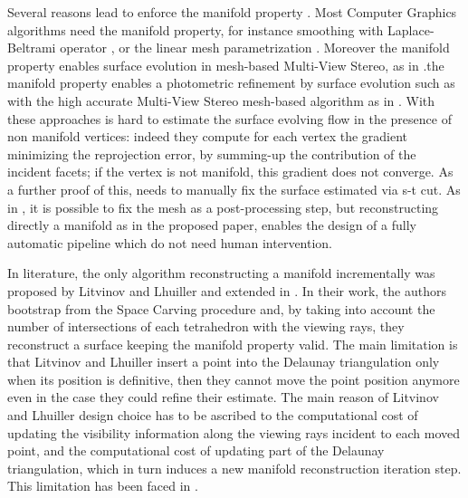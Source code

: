 Several reasons lead to enforce the manifold property \cite{lhuillier20152}. 
Most Computer Graphics algorithms need the manifold property, for instance smoothing with Laplace-Beltrami operator \cite{Meyer03}, or the linear mesh parametrization \cite{saboret00}.
Moreover the manifold property enables surface evolution in mesh-based Multi-View Stereo, as in \cite{vu_et_al_2012,delaunoy_et_al_08}.the manifold property enables a photometric refinement by surface evolution such as with the high accurate Multi-View Stereo mesh-based algorithm as in \cite{vu_et_al_2012,delaunoy_et_al_08}.
With these approaches is hard to estimate the surface evolving flow in the presence of non manifold vertices: indeed they compute for each vertex the gradient minimizing the reprojection error, by summing-up the contribution of the incident facets; if the vertex is not manifold, this gradient does not converge. As a further proof of this, \cite{vu_et_al_2012} needs to manually fix the surface estimated via s-t cut.
As in \cite{vu_et_al_2012}, it is possible to fix the mesh as a post-processing step, but reconstructing directly a manifold as in the proposed paper, enables the design of a fully automatic pipeline which do not need human intervention.

In literature, the only algorithm reconstructing a manifold incrementally was proposed by Litvinov and Lhuiller \cite{litvinov_lhuillier_13,litvinov_Lhiuller14} and extended in \cite{romanoni15a,romanoni15b}. 
In their work, the authors  bootstrap from the Space Carving procedure and, by taking into account the number of intersections of each tetrahedron with the viewing rays, they reconstruct a surface keeping the manifold property valid. 
The main limitation is that  Litvinov and Lhuiller insert a point into the Delaunay triangulation only when its position is definitive, then they cannot move the point position anymore even in the case they could refine their estimate. 
The main reason of Litvinov and Lhuiller design choice has to be ascribed to the computational cost of updating the visibility information along the viewing rays incident to each moved point, and the computational cost of updating part of the Delaunay triangulation, which in turn induces a new manifold reconstruction iteration step. This limitation has been faced in \cite{romanoni15a}.

